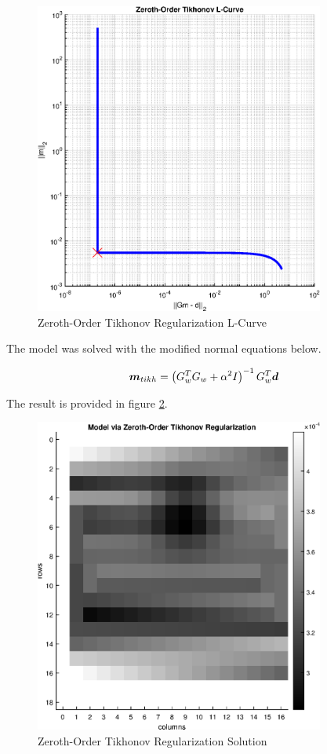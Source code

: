  \begin{figure}[h] 
 	\centering
 	\includegraphics[width=0.85\textwidth]{./images/prob3_partB_tikh_L_Curve.eps}
 	\caption{Zeroth-Order Tikhonov Regularization L-Curve}
 	\label{fig: prob3 partB L-curve}
 \end{figure}
 \FloatBarrier
 
The model was solved with the modified normal equations below.

\begin{align*}
	\boldsymbol{m}_{tikh} = \left(G_w^T G_w + \alpha^2 I\right)^{-1} G_w^T \boldsymbol{d}
\end{align*}

The result is provided in figure \ref{fig: prob3 partB model}.
 
 \begin{figure}[h] 
 	\centering
 	\includegraphics[width=0.85\textwidth]{./images/prob3_partB_m_tikh.eps}
 	\caption{Zeroth-Order Tikhonov Regularization Solution}
 	\label{fig: prob3 partB model}
 \end{figure}
 \FloatBarrier
 
